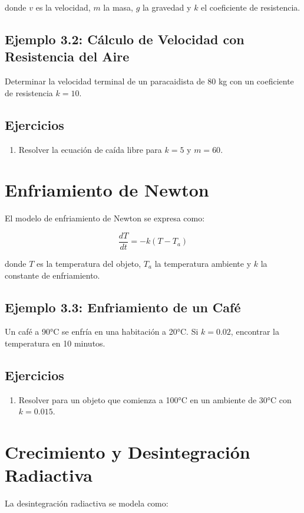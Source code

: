 donde \( v \) es la velocidad, \( m \) la masa, \( g \) la gravedad y \( k \) el coeficiente de resistencia.

\subsection*{Ejemplo 3.2: Cálculo de Velocidad con Resistencia del Aire}
Determinar la velocidad terminal de un paracaidista de 80 kg con un coeficiente de resistencia \( k = 10 \).

\subsection*{Ejercicios}
\begin{enumerate}
    \item Resolver la ecuación de caída libre para \( k = 5 \) y \( m = 60 \).
\end{enumerate}

\section{Enfriamiento de Newton}
El modelo de enfriamiento de Newton se expresa como:

\begin{equation}
\frac{dT}{dt} = -k (T - T_a)
\end{equation}

donde \( T \) es la temperatura del objeto, \( T_a \) la temperatura ambiente y \( k \) la constante de enfriamiento.

\subsection*{Ejemplo 3.3: Enfriamiento de un Café}
Un café a 90°C se enfría en una habitación a 20°C. Si \( k = 0.02 \), encontrar la temperatura en 10 minutos.

\subsection*{Ejercicios}
\begin{enumerate}
    \item Resolver para un objeto que comienza a 100°C en un ambiente de 30°C con \( k = 0.015 \).
\end{enumerate}

\section{Crecimiento y Desintegración Radiactiva}
La desintegración radiactiva se modela como:

